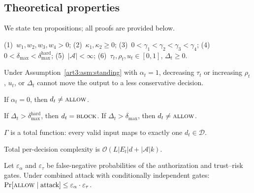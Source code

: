 \subsection{Theoretical properties}
\label{art3:sec:theory}

We state ten propositions; all proofs are provided below.

\begin{assumption}
\label{art3:asm:standing}
(1)~$w_1, w_2, w_3, w_4 > 0$;
(2)~$\kappa_1, \kappa_2 \ge 0$;
(3)~$0 < \gamma_1 < \gamma_2 < \gamma_3 < \gamma_4$;
(4)~$0 < \delta_{\max} < \delta_{\max}^{\mathrm{hard}}$;
(5)~$|\mathcal{A}| < \infty$;
(6)~$\tau_t, \rho_t, u_t \in [0,1]$, $\Delta_t \ge 0$.
\end{assumption}

\begin{proposition}
\label{art3:prop:monotone}
Under Assumption~\ref{art3:asm:standing} with $\alpha_t=1$, decreasing $\tau_t$ or increasing $\rho_t$, $u_t$, or $\Delta_t$ cannot move the output to a less conservative decision.
\end{proposition}

\begin{proposition}
\label{art3:prop:authz}
If $\alpha_t = 0$, then $d_t \neq \textup{\textsc{allow}}$.
\end{proposition}

\begin{proposition}
\label{art3:prop:divergence}
If $\Delta_t > \delta_{\max}^{\mathrm{hard}}$, then $d_t = \textup{\textsc{block}}$.
If $\Delta_t > \delta_{\max}$, then $d_t \neq \textup{\textsc{allow}}$.
\end{proposition}

\begin{proposition}
\label{art3:prop:completeness}
$\Gamma$ is a total function: every valid input maps to exactly one $d_t \in \mathcal{D}$.
\end{proposition}

\begin{proposition}
\label{art3:prop:complexity}
Total per-decision complexity is $\mathcal{O}(L|E_t|d + |\mathcal{A}|k)$.
\end{proposition}

\begin{proposition}
\label{art3:prop:depth}
Let $\varepsilon_\alpha$ and $\varepsilon_\tau$ be false-negative probabilities of the authorization and trust--risk gates.
Under combined attack with conditionally independent gates: $\Pr[\textup{\textsc{allow}} \mid \text{attack}] \le \varepsilon_\alpha \cdot \varepsilon_\tau$.
\end{proposition}

